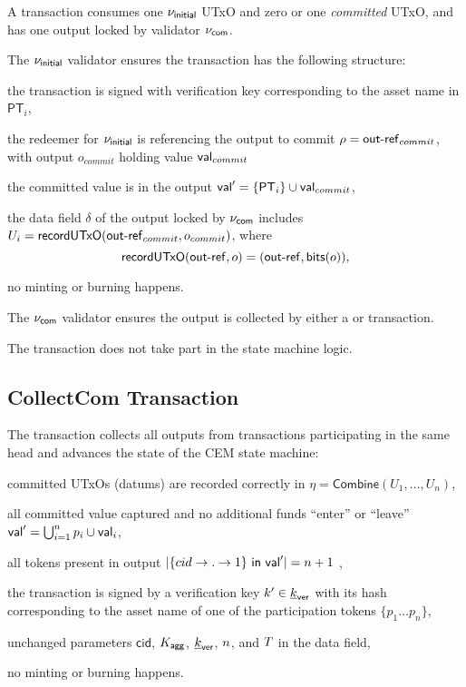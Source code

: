 A \mtxCom{} transaction consumes one $\nu_\mathsf{initial}$ UTxO and zero or one \emph{committed} UTxO, and has one output locked by validator $\nu_\mathsf{com}$. 

The $\nu_\mathsf{initial}$ validator ensures the transaction has the following structure:
\begin{menumerate}
    \item the transaction is signed with verification key corresponding to the asset name in $\mathsf{PT}_i$,
    \item the redeemer for $\nu_\mathsf{initial}$ is referencing the output to commit $ \rho = \mathsf{out\textsf{-}{}ref}_{commit}$, with output $o_{commit}$ holding value $\mathsf{val}_{commit}$
    \item the committed value is in the output $\mathsf{val}' = \{\mathsf{PT}_{i}\} \cup \mathsf{val}_{commit} $,
    \item the data field $\delta$ of the output locked by $\nu_\mathsf{com}$ includes 
    $U_i = \mathsf{recordUTxO}(\mathsf{out\textsf{-}{}ref}_{commit},o_{commit})$, where 
    $$\mathsf{recordUTxO} (\mathsf{out\textsf{-}{}ref}, o) = (\mathsf{out\textsf{-}{}ref}, \mathsf{bits}(o)),
    $$
    \item no minting or burning happens.
\end{menumerate}

The $\nu_\mathsf{com}$ validator ensures the output is collected by either a \mtxCCom{} or \mtxAbort{} transaction.
\begin{boxM}
The \mtxCom{} transaction does not take part in the state machine logic.
\end{boxM}


\subsection{CollectCom Transaction} 



The \mtxCCom{} transaction collects all outputs from \mtxCom{} transactions participating in the same head and advances the state of the CEM state machine:


\begin{menumerate}
  \item committed UTxOs (datums) are recorded correctly in
  $\eta = \mathsf{Combine}(U_{1}, \ldots, U_{n})$,
  \item all committed value captured and no additional funds ``enter'' or ``leave''
  $\mathsf{val}' = \bigcup_{i=1}^{n} p_{i} \cup \mathsf{val}_{i}$,
  \item all tokens present in output
  $|\{cid \rightarrow . \rightarrow 1\} ~ \mathsf{in} ~ \mathsf{val}'| = n + 1$
  ,
  \item the transaction is signed by a verification key $k' \in \underline{k}_{\mathsf{ver}}$ with its
  hash corresponding to the asset name of one of the participation tokens
  $\{p_1 \dots p_n\}$,
  \item unchanged parameters $\mathsf{cid}$, $K_{\mathsf{agg}}$, $\underline{k}_{\mathsf{ver}}$, $n$, and
  $T$ in the data field,
  \item no minting or burning happens.
\end{menumerate}

